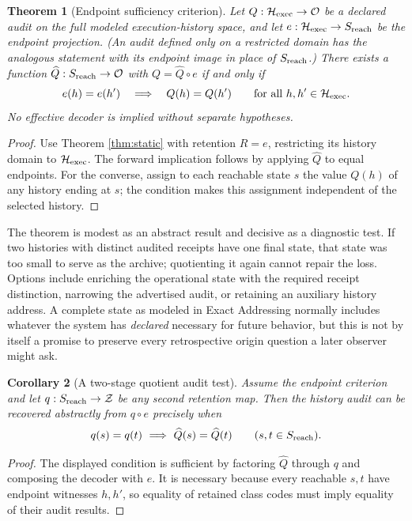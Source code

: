 \documentclass[11pt,letterpaper]{article}
\newtheorem{theorem}{Theorem}[section]
\newtheorem{corollary}[theorem]{Corollary}
\theoremstyle{definition}
\newcommand{\Hh}{\mathcal H}
\newcommand{\Obs}{\mathcal O}
\begin{document}
\begin{theorem}[Endpoint sufficiency criterion]\label{thm:endpoint}
Let $Q:\Hh_{\rm exec}\to\Obs$ be a declared audit on the full modeled execution-history space, and let $e:\Hh_{\rm exec}\to S_{\rm reach}$ be the endpoint projection. (An audit defined only on a restricted domain has the analogous statement with its endpoint image in place of $S_{\rm reach}$.) There exists a function $\widehat Q:S_{\rm reach}\to\Obs$ with $Q=\widehat Q\circ e$ if and only if
\[
e(h)=e(h')\quad\Longrightarrow\quad Q(h)=Q(h')
\qquad\text{for all }h,h'\in\Hh_{\rm exec}.
\]
No effective decoder is implied without separate hypotheses.
\end{theorem}
\begin{proof}
Use Theorem \ref{thm:static} with retention $R=e$, restricting its history domain to $\Hh_{\rm exec}$. The forward implication follows by applying $\widehat Q$ to equal endpoints. For the converse, assign to each reachable state $s$ the value $Q(h)$ of any history ending at $s$; the condition makes this assignment independent of the selected history.
\end{proof}

The theorem is modest as an abstract result and decisive as a diagnostic test. If two histories with distinct audited receipts have one final state, that state was too small to serve as the archive; quotienting it again cannot repair the loss. Options include enriching the operational state with the required receipt distinction, narrowing the advertised audit, or retaining an auxiliary history address. A complete state as modeled in Exact Addressing normally includes whatever the system has \emph{declared} necessary for future behavior, but this is not by itself a promise to preserve every retrospective origin question a later observer might ask.

\begin{corollary}[A two-stage quotient audit test]\label{cor:two-stage}
Assume the endpoint criterion and let $q:S_{\rm reach}\to\mathcal Z$ be any second retention map. Then the history audit can be recovered abstractly from $q\circ e$ precisely when
\[
q(s)=q(t)\ \Longrightarrow\ \widehat Q(s)=\widehat Q(t)
\qquad(s,t\in S_{\rm reach}).
\]
\end{corollary}
\begin{proof}
The displayed condition is sufficient by factoring $\widehat Q$ through $q$ and composing the decoder with $e$. It is necessary because every reachable $s,t$ have endpoint witnesses $h,h'$, so equality of retained class codes must imply equality of their audit results.
\end{proof}
\end{document}

